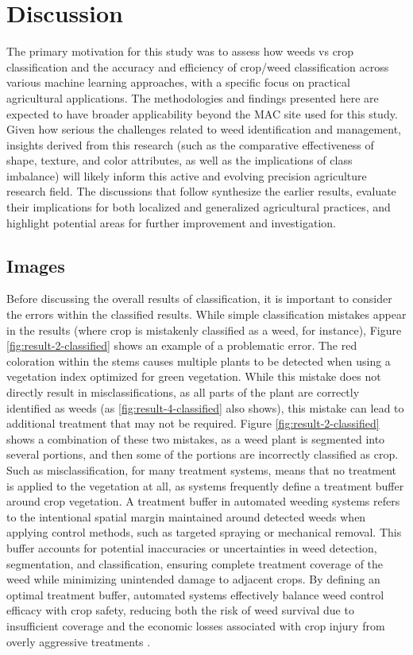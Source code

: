 \documentclass[letterpaper, notitlepage]{report}
\begin{document}
%
%

\chapter{Discussion}
\label{section:discussion}
The primary motivation for this study was to assess how weeds vs crop classification and the accuracy and efficiency of crop/weed classification across various machine learning approaches, with a specific focus on practical agricultural applications. The methodologies and findings presented here are expected to have broader applicability beyond the MAC site used for this study. Given how serious the challenges related to weed identification and management, insights derived from this research (such as the comparative effectiveness of shape, texture, and color attributes, as well as the implications of class imbalance) will likely inform this active and evolving precision agriculture research field. The discussions that follow synthesize the earlier results, evaluate their implications for both localized and generalized agricultural practices, and highlight potential areas for further improvement and investigation.

\section{Images}
Before discussing the overall results of classification, it is important to consider the errors within the classified results. While simple classification mistakes appear in the results (where crop is mistakenly classified as a weed, for instance), Figure \ref{fig:result-2-classified} shows an example of a problematic error. The red coloration within the stems causes multiple plants to be detected when using a vegetation index optimized for green vegetation. While this mistake does not directly result in misclassifications, as all parts of the plant are correctly identified as weeds (as \ref{fig:result-4-classified} also shows), this mistake can lead to additional treatment that may not be required. Figure \ref{fig:result-2-classified} shows a combination of these two mistakes, as a weed plant is segmented into several portions, and then some of the portions are incorrectly classified as crop. Such as misclassification, for many treatment systems, means that no treatment is applied to the vegetation at all, as systems frequently define a treatment buffer around crop vegetation. A treatment buffer in automated weeding systems refers to the intentional spatial margin maintained around detected weeds when applying control methods, such as targeted spraying or mechanical removal. This buffer accounts for potential inaccuracies or uncertainties in weed detection, segmentation, and classification, ensuring complete treatment coverage of the weed while minimizing unintended damage to adjacent crops. By defining an optimal treatment buffer, automated systems effectively balance weed control efficacy with crop safety, reducing both the risk of weed survival due to insufficient coverage and the economic losses associated with crop injury from overly aggressive treatments \parencite{Scott-Stoddard2023-he, Sapkota2023-kx}.
\end{document}
